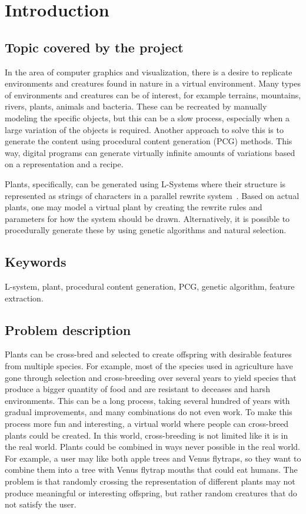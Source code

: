 \chapter{Introduction}
\label{chap:introduction}

\section{Topic covered by the project}
In the area of computer graphics and visualization, there is a desire to replicate environments and creatures found in nature in a virtual environment.
Many types of environments and creatures can be of interest, for example terrains, mountains, rivers, plants, animals and bacteria.
These can be recreated by manually modeling the specific objects, but this can be a slow process, especially when a large variation of the objects is required.
Another approach to solve this is to generate the content using procedural content generation (PCG) methods.
This way, digital programs can generate virtually infinite amounts of variations based on a representation and a recipe.

Plants, specifically, can be generated using L-Systems where their structure is represented as strings of characters in a parallel rewrite system~\cite{2012Prusinkiewicz}.
Based on actual plants, one may model a virtual plant by creating the rewrite rules and parameters for how the system should be drawn.
Alternatively, it is possible to procedurally generate these by using genetic algorithms and natural selection.

\section{Keywords}
L-system, plant, procedural content generation, PCG, genetic algorithm, feature extraction.

\section{Problem description}
\label{sec:ProblemDescription}
Plants can be cross-bred and selected to create offspring with desirable features from multiple species.
For example, most of the species used in agriculture have gone through selection and cross-breeding over several years to yield species that produce a bigger quantity of food and are resistant to deceases and harsh environments.
This can be a long process, taking several hundred of years with gradual improvements, and many combinations do not even work.
To make this process more fun and interesting, a virtual world where people can cross-breed plants could be created.
In this world, cross-breeding is not limited like it is in the real world.
Plants could be combined in ways never possible in the real world.
For example, a user may like both apple trees and Venus flytraps, so they want to combine them into a tree with Venus flytrap mouths that could eat humans.
The problem is that randomly crossing the representation of different plants may not produce meaningful or interesting offspring, but rather random creatures that do not satisfy the user.

